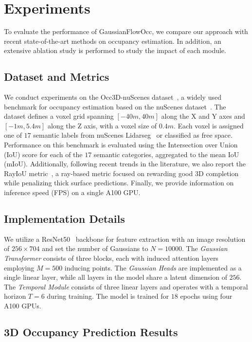 \documentclass[10pt,twocolumn,letterpaper]{article}
\begin{document}
\section{Experiments} \label{sec:experiments}
To evaluate the performance of GaussianFlowOcc, we compare our approach with recent state-of-the-art methods on occupancy estimation.
In addition, an extensive ablation study is performed to study the impact of each module. 

\subsection{Dataset and Metrics}
We conduct experiments on the Occ3D-nuScenes dataset~\cite{tian2023occ3d}, a widely used benchmark for occupancy estimation based on the nuScenes dataset~\cite{caesar2020nuscenes}.
The dataset defines a voxel grid spanning $[-40m, 40m]$ along the X and Y axes and $[-1m, 5.4m]$ along the Z axis, with a voxel size of $0.4m$.
Each voxel is assigned one of $17$ semantic labels from nuScenes Lidarseg~\cite{fong2021panoptic} or classified as free space.
Performance on this benchmark is evaluated using the Intersection over Union (IoU) score for each of the $17$ semantic categories, aggregated to the mean IoU (mIoU).
Additionally, following recent trends in the literature, we also report the RayIoU metric~\cite{liu2024fully}, a ray-based metric focused on rewarding good 3D completion while penalizing thick surface predictions.
Finally, we provide information on inference speed (FPS) on a single A100 GPU.

\subsection{Implementation Details}
We utilize a ResNet50~\cite{he2016deep} backbone for feature extraction with an image resolution of $256\times704$ and set the number of Gaussians to $N=10000$.
The \emph{Gaussian Transformer} consists of three blocks, each with induced attention layers employing $M=500$ inducing points.
The \emph{Gaussian Heads} are implemented as a single linear layer, while all layers in the model share a latent dimension of $256$.
The \emph{Temporal Module} consists of three linear layers and operates with a temporal horizon $T=6$ during training.
The model is trained for $18$ epochs using four A100 GPUs.

\subsection{3D Occupancy Prediction Results}
\end{document}
